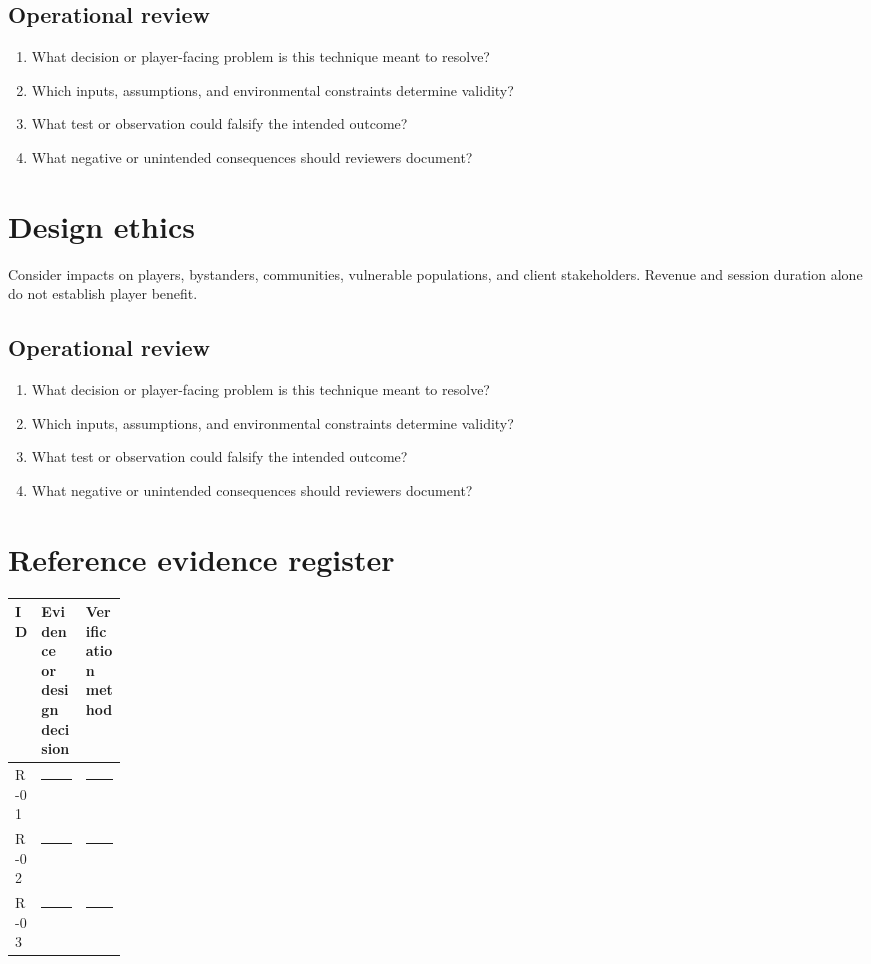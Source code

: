 \documentclass[11pt]{article}
\begin{document}
\subsection{Operational review}
\begin{enumerate}
\item What decision or player-facing problem is this technique meant to resolve?
\item Which inputs, assumptions, and environmental constraints determine validity?
\item What test or observation could falsify the intended outcome?
\item What negative or unintended consequences should reviewers document?
\end{enumerate}

\section{Design ethics}
Consider impacts on players, bystanders, communities, vulnerable populations, and client stakeholders. Revenue and session duration alone do not establish player benefit.


\subsection{Operational review}
\begin{enumerate}
\item What decision or player-facing problem is this technique meant to resolve?
\item Which inputs, assumptions, and environmental constraints determine validity?
\item What test or observation could falsify the intended outcome?
\item What negative or unintended consequences should reviewers document?
\end{enumerate}

\section{Reference evidence register}
\begin{tabularx}{\linewidth}{@{}p{0.13\linewidth}X X@{}}\toprule ID & Evidence or design decision & Verification method\\\midrule
R-01 & \rule{0.95\linewidth}{0.4pt} & \rule{0.95\linewidth}{0.4pt}\\[0.4cm]
R-02 & \rule{0.95\linewidth}{0.4pt} & \rule{0.95\linewidth}{0.4pt}\\[0.4cm]
R-03 & \rule{0.95\linewidth}{0.4pt} & \rule{0.95\linewidth}{0.4pt}\\\bottomrule\end{tabularx}
\end{document}
